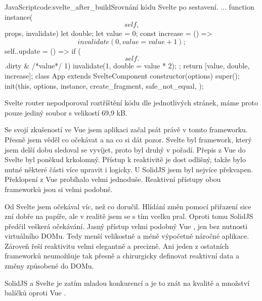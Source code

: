 \documentclass[
  master,
  program=ainf,
  tables=false,
  sourcecodes,
  glossaries,
  index
]{kidiplom}
\begin{document}

  \begin{kicode}{JavaScript}{code:svelte_after_build}{Srovnání kódu Svelte po sestavení.}
    ...
    function instance($$self, $$props, $$invalidate) {
      let double;
      let value = 0;
      const increase = () => $$invalidate(0, value = value + 1);
      $$self.$$.update = () => {
        if ($$self.$$.dirty & /*value*/
        1) { $$invalidate(1, double = value * 2); }
      };
      return [value, double, increase];
    }
    class App extends SvelteComponent {
      constructor(options) {
        super();
        init(this, options, instance, create_fragment, safe_not_equal, {});
      }
    }
\end{kicode}

Svelte \cite{svelte} router nepodporoval roztříštění kódu dle jednotlivých stránek, máme proto pouze jediný soubor
s velikostí 69,9 kB.


\begin{kiconclusions}
  Se svojí zkušeností ve Vue \cite{vue} jsem aplikaci začal psát právě v tomto frameworku. Přesně jsem věděl co očekávat a na
  co si dát pozor. Svelte \cite{svelte} byl framework, který jsem delší dobu sledoval se vyvíjet, proto byl druhý v pořadí. Přepis
  z Vue \cite{vue} do Svelte \cite{svelte} byl poněkud krkolomný. Přístup k reaktivitě je dost odlišný, takže bylo nutné některé části více
  upravit i logicky. U SolidJS \cite{solidjs} jsem byl nejvíce překvapen. Překlopení z Vue \cite{vue} probíhalo velmi jednoduše. Reaktivní
  přístupy obou frameworků jsou si velmi podobné. 

  Od Svelte \cite{svelte} jsem očekával víc, než co doručil. Hlídání změn pomocí přiřazení sice zní dobře na papíře, ale v realitě
  jsem se s tím vcelku pral. Oproti tomu SolidJS \cite{solidjs} předčil veškerá očekávání. Jasný přístup velmi podobný Vue \cite{vue}, jen
  bez nutnosti virtuálního DOMu. Tedy menší velikostně a méně výpočetně náročné aplikace. Zároveň řeší reaktivitu velmi
  elegantně a precizně. Ani jeden z ostatních frameworků neumožňuje tak přesně a chirurgicky definovat reaktivní data a
  změny způsobené do DOMu.
  
  SolidJS \cite{solidjs} a Svelte \cite{svelte} je zatím mladou konkurencí a je to znát na kvalitě a množství balíčků oproti Vue \cite{vue}. 
\end{kiconclusions}
\end{document}

